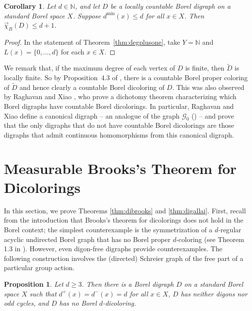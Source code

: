 \documentclass[psamsfonts]{amsart}
\newtheorem{cor}[thm]{Corollary}
\newtheorem{prop}[thm]{Proposition}
\theoremstyle{definition}
\newcommand{\N}{\mathbb N}
\theoremstyle{remark}
\numberwithin{equation}{section}
\begin{document}
\begin{cor}
    Let $d \in \N$, and let $D$ be a locally countable Borel digraph on a standard Borel space $X$. Suppose $d^{\min}(x) \leq d$ for all $x \in X$. Then $\overrightarrow{\chi}_B(D) \leq d + 1$.
\end{cor}

\begin{proof} 
    In the statement of Theorem~\ref{thm:degplusone}, take $Y = \N$ and $L(x) = \{0, \dots, d\}$ for each $x \in X$.
\end{proof}

We remark that, if the maximum degree of each vertex of $D$ is finite, then $\tilde{D}$ is locally finite. So by Proposition~4.3 of \cite{kst1999}, there is a countable Borel proper coloring of $\tilde{D}$ and hence clearly a countable Borel dicoloring of $D$. This was also observed by Raghavan and Xiao \cite{dx2024}, who prove a dichotomy theorem characterizing which Borel digraphs have countable Borel dicolorings. In particular, Raghavan and Xiao define a canonical digraph -- an analogue of the graph $\mathcal{G}_0$ (\cite[Definition~6.1]{kst1999}) -- and prove that the only digraphs that do not have countable Borel dicolorings are those digraphs that admit continuous homomorphisms from this canonical digraph.

\section{Measurable Brooks's Theorem for Dicolorings}
In this section, we prove Theorems \ref{thm:dibrooks} and \ref{thm:digallai}. First, recall from the introduction that Brooks's theorem for dicolorings does not hold in the Borel context; the simplest counterexample is the symmetrization of a $d$-regular acyclic undirected Borel graph that has no Borel proper $d$-coloring (see Theorem 1.3 in \cite{marks2016}). However, even digon-free digraphs provide counterexamples. The following construction involves the (directed) Schreier graph of the free part of a particular group action.

\begin{prop}
\label{prop:no borel dibrooks}
    Let $d \geq 3$. Then there is a Borel digraph $D$ on a standard Borel space $X$ such that $d^+(x) = d^-(x) = d$ for all $x \in X$, $D$ has neither digons nor odd cycles, and $D$ has no Borel $d$-dicoloring.
\end{prop}
\end{document}
